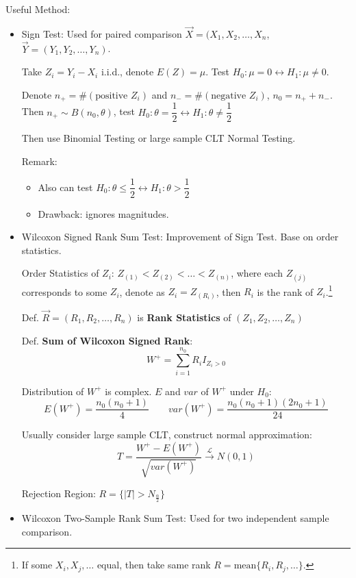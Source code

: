 \documentclass[11pt,a4paper]{ctexart}
\numberwithin{equation}{section}%
\begin{document}
    Useful Method:
    \begin{itemize}
        \item Sign Test: Used for paired comparison $\vec{X}=(X_1,X_2,\ldots,X_n$, $\vec{Y}=(Y_1,Y_2,\ldots,Y_n)$.
        
        Take $Z_i=Y_i-X_i$ i.i.d., denote $E(Z)=\mu$. Test $H_0:\mu=0\longleftrightarrow H_1:\mu\neq 0$.

        Denote $n_+=\#(\text{positive } Z_i)$ and $n_-=\#(\text{negative }Z_i)$, $n_0=n_++n_-$. Then $n_+\sim B(n_0,\theta)$, test $H_0:\theta=\dfrac{1}{2}\longleftrightarrow H_1:\theta\neq\dfrac{1}{2}$
        
        Then use Binomial Testing or large sample CLT Normal Testing.

        Remark:
        \begin{itemize}
            \item Also can test $H_0:\theta\leq\dfrac{1}{2}\longleftrightarrow H_1:\theta>\dfrac{1}{2}$
            \item Drawback: ignores magnitudes.
        \end{itemize}
        
        \item Wilcoxon Signed Rank Sum Test: Improvement of Sign Test. Base on order statistics.
        
        Order Statistics of $Z_i$: $Z_{(1)}<Z_{(2)}<\ldots<Z_{(n)}$, where each $Z_{(j)}$ corresponds to some $Z_i$, denote as $Z_i=Z_{(R_i)}$, then $R_i$ is the rank of $Z_i$.\footnote{If some $X_i,X_j,\ldots$ equal, then take same rank $R=\mathrm{mean}\{R_i,R_j,\ldots\}$.}
        
        Def. $\vec{R}=(R_1,R_2,\ldots,R_n)$ is \textbf{Rank Statistics} of $(Z_1,Z_2,\ldots,Z_n)$

        Def. \textbf{Sum of Wilcoxon Signed Rank}: 
        \[
        W^+=\sum_{i=1}^{n_0}R_iI_{Z_i>0} 
        \]

        Distribution of $W^+$ is complex. $E$ and $var$ of $W^+$ under $H_0$:
        \[
        E(W^+)=\frac{n_0(n_0+1)}{4}\qquad var(W^+)=\frac{n_0(n_0+1)(2n_0+1)}{24}    
        \]

        Usually consider large sample CLT, construct normal approximation:
        \[
            T=\frac{W^+-E(W^+)}{\sqrt{var(W^+)}}\xrightarrow[]{\mathscr{L}}N(0,1)
        \]

        Rejection Region: $R=\{|T|>N_\frac{\alpha}{2}\}$

        \item Wilcoxon Two-Sample Rank Sum Test: Used for two independent sample comparison.
        

\end{itemize}
\end{document}

